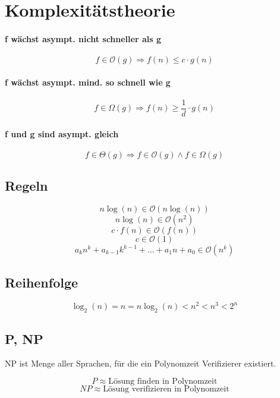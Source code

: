 
\section{Komplexitätstheorie}
%
%
%
%
%
%
%


\paragraph{f wächst asympt. nicht schneller als g}
\[
f \in \mathcal{O}(g) \Rightarrow f(n) \leq c \cdot g(n)
\]
\paragraph{f wächst asympt. mind. so schnell wie g}
\[
f \in \Omega(g) \Rightarrow f(n) \geq \frac{1}{d} \cdot g(n)
\]
\paragraph{f und g sind asympt. gleich}
\[
f \in \Theta(g) \Rightarrow f \in \mathcal{O}(g) \land f \in \Omega(g)
\]

\subsection{Regeln}
\[
n \log(n) \in \mathcal{O}(n \log(n))
\]
\[
n \log(n) \in \mathcal{O}(n^2)
\]
\[
c \cdot f(n) \in \mathcal{O}(f(n))
\]
\[
c \in \mathcal{O}(1)
\]
\[
a_kn^k+a_{k-1}k^{k-1}+...+a_1n+a_0 \in \mathcal{O}(n^k)
\]

\subsection{Reihenfolge}
\[
\log_2(n) = n = n \log_2(n) < n^2 < n^3 < 2^n
\]

\subsection{P, NP}

NP ist Menge aller Sprachen, für die ein Polynomzeit Verifizierer existiert.

\[
P \approx \text{Lösung finden in Polynomzeit}
\]
\[
NP \approx \text{Lösung verifizieren in Polynomzeit}
\]